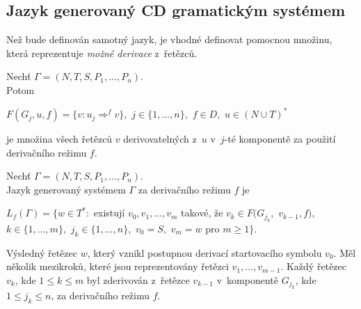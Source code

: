 \subsection*{Jazyk generovaný CD gramatickým systémem}
Než bude definován samotný jazyk, je vhodné definovat pomocnou množinu, která reprezentuje \emph{možné derivace} z~řetězců.
\begin{definition}\label{def_mozne_derivace}
    Nechť $\Gamma = (N, T, S, P_1, \ldots, P_n)$. \\  
    Potom 
    \begin{center}
        $F(G_j,u,f)=\{v:u_j\Rightarrow^{f}v\},$ $j \in \{1, \ldots, n\},$ $f\in D,$ $u\in (N \cup T)^{*}$
    \end{center}        
    je množina všech řetězců $v$ derivovatelných z~$u$ v~$j$-té komponentě za použití derivačního režimu $f$.
\end{definition}

\begin{definition}\label{def_generovany_jazyk}
    Nechť $\Gamma = (N, T, S, P_1, \ldots, P_n)$. \\  
    Jazyk generovaný systémem $\Gamma$ za derivačního režimu $f$ je 
    \begin{center}
         $L_f(\Gamma) = \{ w \in T^*:$ existují $v_0, v_1,\ldots, v_m$ takové, že $v_k \in F(G_{j_{k}},$ $v_{k-1}, f),$\\$k \in \{1, \ldots, m\},$ $j_k \in \{1, \ldots, n\},$ $v_0 = S,$ $v_m = w$ pro $m \geq 1\}$.  
    \end{center}        
\end{definition} 

Výsledný řetězec $w$, který vznikl postupnou derivací startovacího symbolu $v_0$.
Měl několik mezikroků, které jsou reprezentovány řetězci $v_1, \ldots, v_{m-1}$.
Každý řetězec $v_k$, kde $1 \leq k \leq m$ byl zderivován z~řetězce $v_{k-1}$ v~komponentě $G_{j_{k}}$, kde $1 \leq j_k \leq n$, za derivačního režimu $f$.


